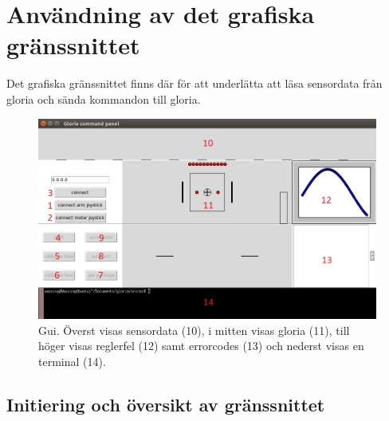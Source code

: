 \section{Användning av det grafiska gränssnittet}

Det grafiska gränssnittet finns där för att underlätta att läsa sensordata från gloria och sända kommandon till gloria.

\begin{figure}[h!]
	\center
	\includegraphics[scale=0.6]{Gui.png}
	\endcenter
	\caption{Gui. Överst visas sensordata (10), i mitten visas gloria (11), till höger visas reglerfel (12) samt errorcodes (13) och nederst visas en terminal (14).}
\end{figure}

\subsection{Initiering och översikt av gränssnittet}

